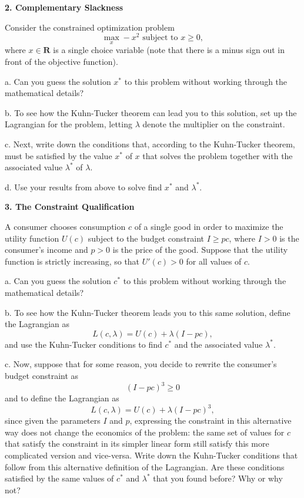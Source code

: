 \documentclass[12pt]{article}
\begin{document}
{\bfseries 2. Complementary Slackness}

Consider the constrained optimization problem
$$
\max_{x} -x^{2} \text{ subject to } x \geq 0,
$$
where $x \in \mathbf{R}$ is a single choice variable (note that there is a minus sign out in front of the objective function).
\begin{description}
\item a. Can you guess the solution $x^{*}$ to this problem without working through the mathematical details?
\item b. To see how the Kuhn-Tucker theorem can lead you to this solution, set up the Lagrangian for the problem, letting $\lambda$ denote the multiplier on the constraint.
\item c. Next, write down the conditions that, according to the Kuhn-Tucker theorem, must be satisfied by the value $x^{*}$ of $x$ that solves the problem together with the associated value $\lambda^{*}$ of $\lambda$.
\item d. Use your results from above to solve find $x^{*}$ and $\lambda^{*}$.
\end{description}

\pagebreak

{\bfseries 3. The Constraint Qualification}

A consumer chooses consumption $c$ of a single good in order to maximize the utility function $U(c)$ subject to the budget constraint $I \geq pc$, where $I>0$ is the consumer's income and $p>0$ is the price of the good. Suppose that the utility function is strictly increasing, so that $U'(c)>0$ for all values of $c$.
\begin{description}
\item a. Can you guess the solution $c^{*}$ to this problem without working through the mathematical details?
\item b. To see how the Kuhn-Tucker theorem leads you to this same solution, define the Lagrangian as
$$
L(c,\lambda) = U(c) + \lambda(I-pc),
$$
and use the Kuhn-Tucker conditions to find $c^{*}$ and the associated value $\lambda^{*}$.
\item c. Now, suppose that for some reason, you decide to rewrite the consumer's budget constraint as
$$
(I-pc)^{3} \geq 0
$$
and to define the Lagrangian as
$$
L(c,\lambda) = U(c) + \lambda(I-pc)^3,
$$
since given the parameters $I$ and $p$, expressing the constraint in this alternative way does not change the economics of the problem: the same set of values for $c$ that satisfy the constraint in its simpler linear form still satisfy this more complicated version and vice-versa. Write down the Kuhn-Tucker conditions that follow from this alternative definition of the Lagrangian. Are these conditions satisfied by the same values of $c^{*}$ and $\lambda^{*}$ that you found before? Why or why not?
\end{description}
\end{document}
